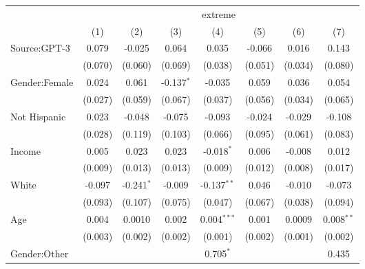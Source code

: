 
\begingroup
\centering
\begin{tabular}{lccccccc}
   \toprule
    & \multicolumn{7}{c}{extreme}\\
                            & (1)           & (2)           & (3)           & (4)           & (5)           & (6)           & (7)\\  
   \midrule 
   Source:GPT-3             & 0.079         & -0.025        & 0.064         & 0.035         & -0.066        & 0.016         & 0.143\\   
                            & (0.070)       & (0.060)       & (0.069)       & (0.038)       & (0.051)       & (0.034)       & (0.080)\\   
   Gender:Female            & 0.024         & 0.061         & -0.137$^{*}$  & -0.035        & 0.059         & 0.036         & 0.054\\   
                            & (0.027)       & (0.059)       & (0.067)       & (0.037)       & (0.056)       & (0.034)       & (0.065)\\   
   Not Hispanic             & 0.023         & -0.048        & -0.075        & -0.093        & -0.024        & -0.029        & -0.108\\   
                            & (0.028)       & (0.119)       & (0.103)       & (0.066)       & (0.095)       & (0.061)       & (0.083)\\   
   Income                   & 0.005         & 0.023         & 0.023         & -0.018$^{*}$  & 0.006         & -0.008        & 0.012\\   
                            & (0.009)       & (0.013)       & (0.013)       & (0.009)       & (0.012)       & (0.008)       & (0.017)\\   
   White                    & -0.097        & -0.241$^{*}$  & -0.009        & -0.137$^{**}$ & 0.046         & -0.010        & -0.073\\   
                            & (0.093)       & (0.107)       & (0.075)       & (0.047)       & (0.067)       & (0.038)       & (0.094)\\   
   Age                      & 0.004         & 0.0010        & 0.002         & 0.004$^{***}$ & 0.001         & 0.0009        & 0.008$^{**}$\\   
                            & (0.003)       & (0.002)       & (0.002)       & (0.001)       & (0.002)       & (0.001)       & (0.002)\\   
   Gender:Other             &               &               &               & 0.705$^{*}$   &               &               & 0.435\\   

\end{tabular}
